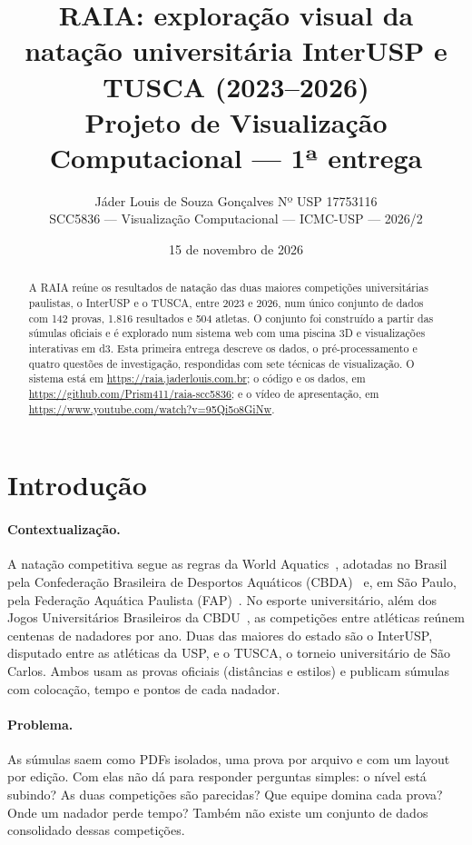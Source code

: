 \documentclass[11pt,a4paper]{article}
\title{\textbf{RAIA}: exploração visual da natação universitária InterUSP e TUSCA (2023--2026)\\[4pt]
\large Projeto de Visualização Computacional --- 1ª entrega}
\author{Jáder Louis de Souza Gonçalves \quad Nº USP 17753116\\
\small SCC5836 --- Visualização Computacional --- ICMC-USP --- 2026/2}
\date{15 de novembro de 2026}
\begin{document}
\maketitle
\thispagestyle{empty}

\begin{abstract}
A RAIA reúne os resultados de natação das duas maiores competições universitárias paulistas, o InterUSP e o TUSCA,
entre 2023 e 2026, num único conjunto de dados com 142 provas, 1.816 resultados e 504 atletas. O conjunto foi
construído a partir das súmulas oficiais e é explorado num sistema web com uma piscina 3D e visualizações
interativas em d3. Esta primeira entrega descreve os dados, o pré-processamento e quatro questões de investigação,
respondidas com sete técnicas de visualização. O sistema está em \url{https://raia.jaderlouis.com.br}; o código e os dados, em \url{https://github.com/Prism411/raia-scc5836}; e o vídeo de apresentação, em \url{https://www.youtube.com/watch?v=95Qi5o8GiNw}.
\end{abstract}

\section{Introdução}\label{sec:intro}

\paragraph{Contextualização.} A natação competitiva segue as regras da World Aquatics~\cite{wa-regras}, adotadas
no Brasil pela Confederação Brasileira de Desportos Aquáticos (CBDA)~\cite{cbda} e, em São Paulo, pela Federação
Aquática Paulista (FAP)~\cite{fap}. No esporte universitário, além dos Jogos Universitários Brasileiros da
CBDU~\cite{cbdu}, as competições entre atléticas reúnem centenas de nadadores por ano. Duas das maiores do estado
são o InterUSP, disputado entre as atléticas da USP, e o TUSCA, o torneio universitário de São Carlos. Ambos usam
as provas oficiais (distâncias e estilos) e publicam súmulas com colocação, tempo e pontos de cada nadador.

\paragraph{Problema.} As súmulas saem como PDFs isolados, uma prova por arquivo e com um layout por edição. Com
elas não dá para responder perguntas simples: o nível está subindo? As duas competições são parecidas? Que equipe
domina cada prova? Onde um nadador perde tempo? Também não existe um conjunto de dados consolidado dessas
competições.
\end{document}
